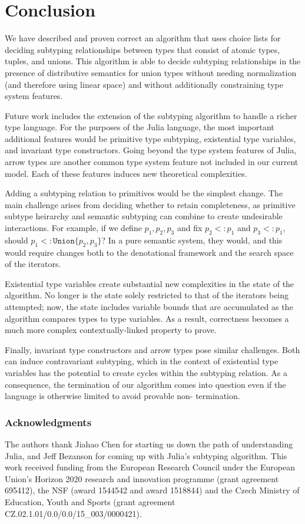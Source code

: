 \documentclass[a4paper,english]{lipics-v2019}
\newcommand{\xt}[1]{\texttt{#1}}
\newcommand{\union}[2]{\xt{Union\{}#1,#2\xt{\}}}
\begin{document}
\section{Conclusion}

We have described and proven correct an algorithm that uses choice lists for deciding
subtyping relationships between types that consist of atomic types, tuples,
and unions. This algorithm is able to decide subtyping relationships in the
presence of distributive semantics for union types without needing
normalization (and therefore using linear space) and without additionally
constraining type system features.

Future work includes the extension of the subtyping algorithm to handle a
richer type language. For the purposes of the Julia language, the most
important additional features would be primitive type subtyping, existential
type variables, and invariant type constructors. Going beyond the type system
features of Julia, arrow types are another common type system feature not included
in our current model. Each of these features induces new theoretical complexities.

Adding a subtyping relation to primitives would be the simplest change. The main
challenge arises from deciding whether to retain completeness, as primitive subtype
heirarchy and semantic subtyping can combine to create undesirable interactions.
For example, if we define $p_1,p_2,p_3$ and fix $p_2 <: p_1$ and $p_3 <: p_1$, 
should $p_1 <: \union{p_2}{p_3}$? In a pure semantic system, they would, and this
would require changes both to the denotational framework and the search space of the
iterators.

Existential type variables create substantial new complexities in the state of
the algorithm. No longer is the state solely restricted to that of the iterators 
being attempted; now, the state includes variable bounds that are accumulated as the
algorithm compares types to type variables. As a result, correctness becomes a much more
complex contextually-linked property to prove.

Finally, invariant type constructors and arrow types pose similar challenges.
Both can induce contravariant subtyping, which in the context of existential
type variables has the potential to create cycles within the subtyping
relation. As a consequence, the termination of our algorithm comes into
question even if the language is otherwise limited to avoid provable non-
termination.

\subsubsection*{Acknowledgments}
The authors thank Jiahao Chen for starting us down the path of understanding
Julia, and Jeff Bezanson for coming up with Julia's subtyping algorithm.  This
work received funding from the European Research Council under the European
Union's Horizon 2020 research and innovation programme (grant agreement
695412), the NSF (award 1544542 and award 1518844) and the Czech Ministry of
Education, Youth and Sports (grant agreement
CZ.02.1.01/0.0/0.0/15\_003/0000421).
 

%

\end{document}
